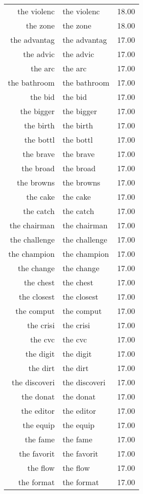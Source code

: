 \begin{table}[ht]
\begin{tabular}{rlr}
  the violenc & the violenc & 18.00 \\ 
  the zone & the zone & 18.00 \\ 
  the advantag & the advantag & 17.00 \\ 
  the advic & the advic & 17.00 \\ 
  the arc & the arc & 17.00 \\ 
  the bathroom & the bathroom & 17.00 \\ 
  the bid & the bid & 17.00 \\ 
  the bigger & the bigger & 17.00 \\ 
  the birth & the birth & 17.00 \\ 
  the bottl & the bottl & 17.00 \\ 
  the brave & the brave & 17.00 \\ 
  the broad & the broad & 17.00 \\ 
  the browns & the browns & 17.00 \\ 
  the cake & the cake & 17.00 \\ 
  the catch & the catch & 17.00 \\ 
  the chairman & the chairman & 17.00 \\ 
  the challenge & the challenge & 17.00 \\ 
  the champion & the champion & 17.00 \\ 
  the change & the change & 17.00 \\ 
  the chest & the chest & 17.00 \\ 
  the closest & the closest & 17.00 \\ 
  the comput & the comput & 17.00 \\ 
  the crisi & the crisi & 17.00 \\ 
  the cvc & the cvc & 17.00 \\ 
  the digit & the digit & 17.00 \\ 
  the dirt & the dirt & 17.00 \\ 
  the discoveri & the discoveri & 17.00 \\ 
  the donat & the donat & 17.00 \\ 
  the editor & the editor & 17.00 \\ 
  the equip & the equip & 17.00 \\ 
  the fame & the fame & 17.00 \\ 
  the favorit & the favorit & 17.00 \\ 
  the flow & the flow & 17.00 \\ 
  the format & the format & 17.00 \\ 

\end{tabular}
\end{table}
